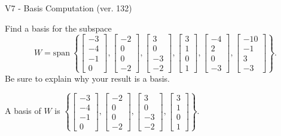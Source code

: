 \begin{exercise}
  \begin{exerciseTitle}V7 - Basis Computation (ver. 132)\end{exerciseTitle}
  \begin{exerciseStatement}
    Find a basis for the subspace 
\[W=\mathrm{span}\ \left\{\left[\begin{array}{r}
-3 \\
-4 \\
-1 \\
0
\end{array}\right] , \left[\begin{array}{r}
-2 \\
0 \\
0 \\
-2
\end{array}\right] , \left[\begin{array}{r}
3 \\
0 \\
-3 \\
-2
\end{array}\right] , \left[\begin{array}{r}
3 \\
1 \\
0 \\
1
\end{array}\right] , \left[\begin{array}{r}
-4 \\
2 \\
0 \\
-3
\end{array}\right] , \left[\begin{array}{r}
-10 \\
-1 \\
3 \\
-3
\end{array}\right]\right\}.\]
 Be sure to explain why your result is a basis.


  \end{exerciseStatement}
  \begin{exerciseAnswer}
   A basis of \(W\) is  \(\left\{\left[\begin{array}{r}
-3 \\
-4 \\
-1 \\
0
\end{array}\right] , \left[\begin{array}{r}
-2 \\
0 \\
0 \\
-2
\end{array}\right] , \left[\begin{array}{r}
3 \\
0 \\
-3 \\
-2
\end{array}\right] , \left[\begin{array}{r}
3 \\
1 \\
0 \\
1
\end{array}\right]\right\}\).
  


  \end{exerciseAnswer}
\end{exercise}